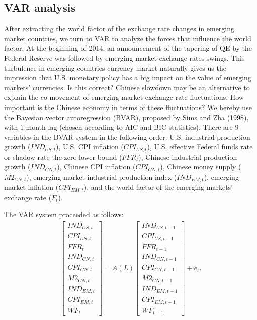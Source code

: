 \documentclass[12pt]{article}
\numberwithin{equation}{section}
\begin{document}
\subsection{VAR analysis}
After extracting the world factor of the exchange rate changes in emerging market countries, we turn to VAR to analyze the forces that influence the world factor. At the beginning of 2014, an announcement of the tapering of QE by the Federal Reserve was followed by emerging market exchange rates swings. This turbulence in emerging countries currency market naturally gives us the impression that U.S. monetary policy has a big impact on the value of emerging markets' currencies. Is this correct? Chinese slowdown may be an alternative to explain the co-movement of emerging market exchange rate fluctuations. How important is the Chinese economy in terms of these fluctuations? We hereby use the Bayesian vector autoregression (BVAR), proposed by Sims and Zha (1998), with 1-month lag (chosen according to AIC and BIC statistics). There are 9 variables in the BVAR system in the following order: U.S. industrial production growth ($IND_{US,t}$), U.S. CPI inflation ($CPI_{US,t}$), U.S. effective Federal funds rate or shadow rate the zero lower bound ($FFR_t$), Chinese industrial production growth ($IND_{CN,t}$), Chinese CPI inflation ($CPI_{CN,t}$), Chinese money supply ($M2_{CN,t}$), emerging market industrial production index ($IND_{EM,t}$), emerging market inflation ($CPI_{EM,t}$), and the world factor of the emerging markets' exchange rate ($F_t$).

The VAR system proceeded as follows:
\begin{eqnarray}
\left[
\begin{aligned}
IND_{US,t}\\CPI_{US,t}\\FFR_t\\IND_{CN,t}\\CPI_{CN,t}\\M2_{CN,t}\\IND_{EM,t}\\CPI_{EM,t}\\WF_t
\end{aligned}
\right]=A(L)\left[
\begin{aligned}
IND_{US,t-1}\\CPI_{US,t-1}\\FFR_{t-1}\\IND_{CN,t-1}\\CPI_{CN,t-1}\\M2_{CN,t-1}\\IND_{EM,t-1}\\CPI_{EM,t-1}\\WF_{t-1}\end{aligned}
\right]+e_t.
\label{eq:var1}
\end{eqnarray}
\end{document}
